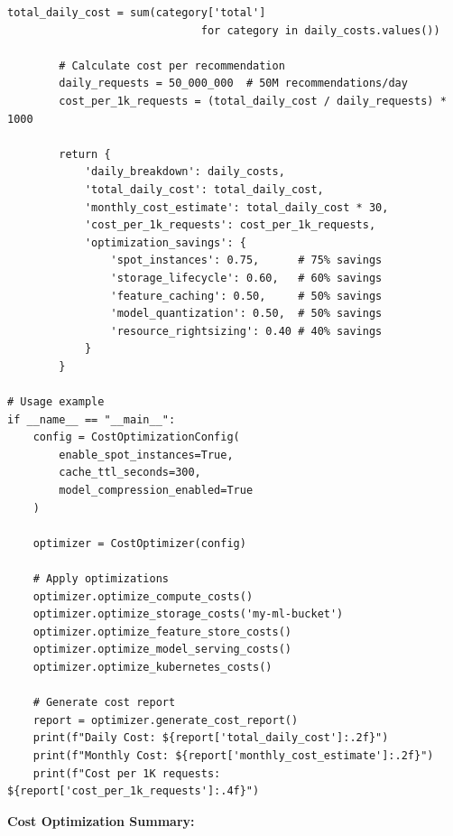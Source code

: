 \begin{lstlisting}[style=python, caption=Cost Optimization Implementation]
        total_daily_cost = sum(category['total']
                              for category in daily_costs.values())

        # Calculate cost per recommendation
        daily_requests = 50_000_000  # 50M recommendations/day
        cost_per_1k_requests = (total_daily_cost / daily_requests) * 1000

        return {
            'daily_breakdown': daily_costs,
            'total_daily_cost': total_daily_cost,
            'monthly_cost_estimate': total_daily_cost * 30,
            'cost_per_1k_requests': cost_per_1k_requests,
            'optimization_savings': {
                'spot_instances': 0.75,      # 75% savings
                'storage_lifecycle': 0.60,   # 60% savings
                'feature_caching': 0.50,     # 50% savings
                'model_quantization': 0.50,  # 50% savings
                'resource_rightsizing': 0.40 # 40% savings
            }
        }

# Usage example
if __name__ == "__main__":
    config = CostOptimizationConfig(
        enable_spot_instances=True,
        cache_ttl_seconds=300,
        model_compression_enabled=True
    )

    optimizer = CostOptimizer(config)

    # Apply optimizations
    optimizer.optimize_compute_costs()
    optimizer.optimize_storage_costs('my-ml-bucket')
    optimizer.optimize_feature_store_costs()
    optimizer.optimize_model_serving_costs()
    optimizer.optimize_kubernetes_costs()

    # Generate cost report
    report = optimizer.generate_cost_report()
    print(f"Daily Cost: ${report['total_daily_cost']:.2f}")
    print(f"Monthly Cost: ${report['monthly_cost_estimate']:.2f}")
    print(f"Cost per 1K requests: ${report['cost_per_1k_requests']:.4f}")
\end{lstlisting}

\textbf{Cost Optimization Summary:}

